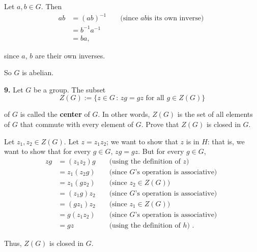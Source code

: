 \documentclass[10pt,]{book}
\newcommand{\terminology}[1]{\textbf{#1}}
\theoremstyle{plain}
\theoremstyle{definition}
\theoremstyle{definition}
\theoremstyle{definition}
\theoremstyle{definition}
\numberwithin{equation}{section}
\newcommand{\amp}{ & }
\begin{document}
      Let \(a,b\in G\). Then%
%
\begin{align*}
ab\amp =(ab)^{-1}\amp \amp \text{ (since \(ab\)
        is its own inverse) }\\
\amp =b^{-1}a^{-1}\amp \amp\\
\amp =ba, \amp
\end{align*}
\par
since \(a\), \(b\) are their own inverses.%
\par

      So \(G\) is abelian.
\par\smallskip
\noindent\textbf{9.}\quad{}
        Let \(G\) be a group. The subset
\begin{equation*}

          Z(G):=\{z \in G\,:\, zg=gz \mbox{ for all } g\in Z(G)\}
        
\end{equation*}

        of \(G\) is called the \terminology{center} of \(G\). In other words, \(Z(G)\) is the set of all elements of \(G\) that commute with every element of \(G\).
        Prove that \(Z(G)\) is closed in \(G\).
\par\smallskip

      Let \(z_1, z_2\in Z(G)\). Let \(z=z_1z_2\); we want to
      show that \(z\) is in \(H\): that is, we want to show that for every \(g\in G\),
      \(zg=gz\). But for every \(g\in G\),
\begin{align*}
zg\amp =(z_1z_2)g\amp \amp  \text{ (using the definition of \(z\)) }\\
\amp =z_1(z_2g)\amp \amp  \text{ (since \(G\)'s operation is associative) }\\
\amp =z_1(gz_2)\amp \amp  \text{ (since \(z_2\in Z(G)\)) }\\
\amp =(z_1g)z_2 \amp \amp  \text{ (since \(G\)'s operation is associative) }\\
\amp =(gz_1)z_2 \amp \amp  \text{ (since \(z_1\in Z(G)\)) }\\
\amp =g(z_1z_2)\amp \amp   \text{ (since \(G\)'s operation is associative) }\\
\amp =gz \amp \amp  \text{ (using the definition of \(h\)) } .
\end{align*}

\par

      Thus, \(Z(G)\) is closed in \(G\).
\par\smallskip
\end{document}
